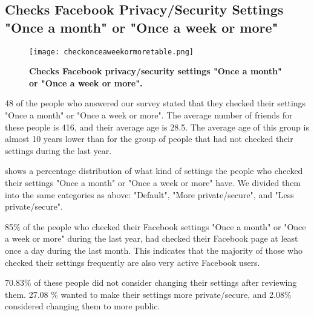 \subsection{Checks Facebook Privacy/Security Settings "Once a month" or "Once a week or more"}

\begin{figure}[h!]
\centering
\texttt{[image: checkonceaweekormoretable.png]}
\caption[Checks Facebook privacy/security settings "Once a month" or "Once a week or more"]{\textbf{Checks Facebook privacy/security settings "Once a month" or "Once a week or more".}} 
\label{fig:onceaweekormore}
\end{figure}

48 of the people who answered our survey stated that they checked their settings "Once a month" or "Once a week or more". The average number of friends for these people is 416, and their average age is 28.5. The average age of this group is almost 10 years lower than for the group of people that had not checked their settings during the last year.

 shows a percentage distribution of what kind of settings the people who checked their settings "Once a month" or "Once a week or more" have. We divided them into the same categories as above: "Default", "More private/secure", and "Less private/secure".  

85\% of the people who checked their Facebook settings "Once a month" or "Once a week or more" during the last year, had checked their Facebook page at least once a day during the last month. This indicates that the majority of those who checked their settings frequently are also very active Facebook users. 

70.83\% of these people did not consider changing their settings after reviewing them. 27.08 \% wanted to make their settings more private/secure, and 2.08\% considered changing them to more public. 





